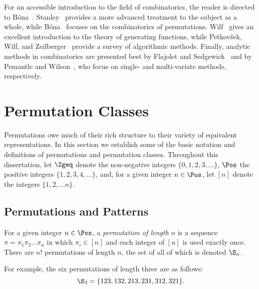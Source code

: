 \documentclass[12pt,twoside]{memoir}
\begin{document}
    For an accessible introduction to the field of combinatorics, the reader is
    directed to B\'ona~\cite{BonaWalk}. Stanley~\cite{Stanley1, Stanley2}
    provides a more advanced treatment to the subject as a whole, while
    B\'ona~\cite{BonaPerm} focuses on the combinatorics of permutations. 
    Wilf~\cite{wilfbook} gives an excellent introduction to the theory of
    generating functions, while Petkov\v{s}ek, Wilf, and Zeilberger~\cite{A=B}
    provide a survey of algorithmic methods. 
    Finally, analytic methods in combinatorics are presented best by Flajolet and
    Sedgewick~\cite{flajolet} and by Pemantle and Wilson~\cite{pemantle}, who
    focus on single- and multi-variate methods, respectively.


  \section{Permutation Classes}
  \label{prelim:sec:perms}

    Permutations owe much of their rich structure to their variety of equivalent
    representations.  In this section we establish some of the basic notation and
    definitions of permutations and permutation classes. Throughout this
    dissertation, let $\Zgeq$ denote the non-negative integers $\{0, 1, 2, 3,
    \dots \}$, $\Pos$ the positive integers $\{1, 2, 3, 4, \dots\}$, and, for a given
    integer $n \in \Pos$, let $[n]$ denote the integers $\{1, 2, \dots n\}$. 

    \subsection{Permutations and Patterns}


      \begin{definition}\label{prelim:def:perm}
        For a given integer $n \in \Pos$, a \emph{permutation of length $n$}
        is a sequence $\pi = \pi_1 \pi_2 \dots \pi_n$ in which
        $\pi_i \in [n]$ and each integer of $[n]$ is used exactly once. There are
        $n!$ permutations of length $n$, the set of all of which is denoted $\S_n$. 
      \end{definition}

      
      For example, the six permutations of length three are as follows: 
      $$ \S_3 = \{123, 132, 213, 231, 312, 321\}. $$
\end{document}
